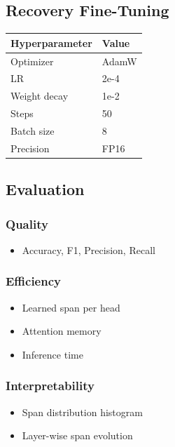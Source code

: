 \subsection{Recovery Fine-Tuning}

\begin{table}[H]
\centering
\small
\begin{tabular}{ll}
\toprule
\textbf{Hyperparameter} & \textbf{Value} \\
\midrule
Optimizer & AdamW \\
LR & 2e-4 \\
Weight decay & 1e-2 \\
Steps & 50 \\
Batch size & 8 \\
Precision & FP16 \\
\bottomrule
\end{tabular}
\end{table}

\subsection{Evaluation}

\subsubsection{Quality}
\begin{itemize}
\item Accuracy, F1, Precision, Recall

\end{itemize}
\subsubsection{Efficiency}
\begin{itemize}
\item Learned span per head
\item Attention memory
\item Inference time

\end{itemize}
\subsubsection{Interpretability}
\begin{itemize}
\item Span distribution histogram
\item Layer-wise span evolution

\end{itemize}
